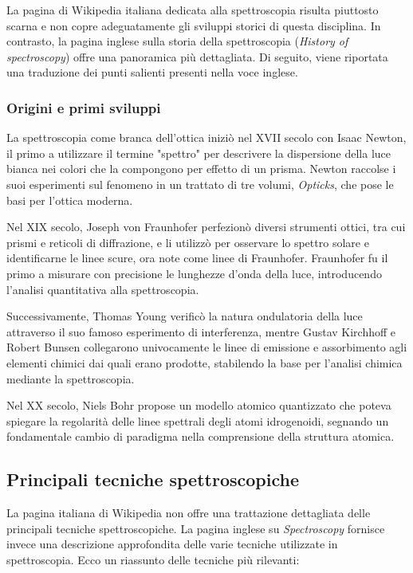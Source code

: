 \documentclass[12pt,a4paper]{report}
\begin{document}
La pagina di Wikipedia italiana dedicata alla spettroscopia risulta piuttosto scarna e non copre adeguatamente gli sviluppi storici di questa disciplina. In contrasto, la pagina inglese sulla storia della spettroscopia (\textit{History of spectroscopy}) offre una panoramica più dettagliata. Di seguito, viene riportata una traduzione dei punti salienti presenti nella voce inglese.

\subsubsection{Origini e primi sviluppi}

La spettroscopia come branca dell'ottica iniziò nel XVII secolo con Isaac Newton, il primo a utilizzare il termine "spettro" per descrivere la dispersione della luce bianca nei colori che la compongono per effetto di un prisma. Newton raccolse i suoi esperimenti sul fenomeno in un trattato di tre volumi, \textit{Opticks}, che pose le basi per l'ottica moderna.

Nel XIX secolo, Joseph von Fraunhofer perfezionò diversi strumenti ottici, tra cui prismi e reticoli di diffrazione, e li utilizzò per osservare lo spettro solare e identificarne le linee scure, ora note come linee di Fraunhofer. Fraunhofer fu il primo a misurare con precisione le lunghezze d'onda della luce, introducendo l'analisi quantitativa alla spettroscopia.

Successivamente, Thomas Young verificò la natura ondulatoria della luce attraverso il suo famoso esperimento di interferenza, mentre Gustav Kirchhoff e Robert Bunsen collegarono univocamente le linee di emissione e assorbimento agli elementi chimici dai quali erano prodotte, stabilendo la base per l'analisi chimica mediante la spettroscopia.

Nel XX secolo, Niels Bohr propose un modello atomico quantizzato che poteva spiegare la regolarità delle linee spettrali degli atomi idrogenoidi, segnando un fondamentale cambio di paradigma nella comprensione della struttura atomica.

\subsection{Principali tecniche spettroscopiche}

La pagina italiana di Wikipedia non offre una trattazione dettagliata delle principali tecniche spettroscopiche. La pagina inglese su \textit{Spectroscopy} fornisce invece una descrizione approfondita delle varie tecniche utilizzate in spettroscopia. Ecco un riassunto delle tecniche più rilevanti:
\end{document}
